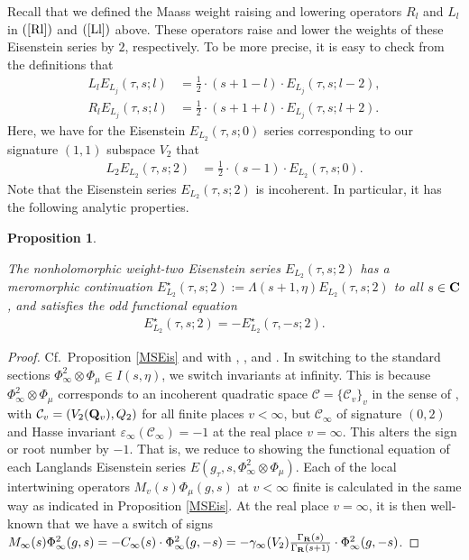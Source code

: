 \documentclass{amsart}
\newtheorem{proposition}[theorem]{Proposition}
\theoremstyle{definition}
\begin{document}
Recall that we defined the Maass weight raising and lowering operators $R_l$ and $L_l$ in $(\ref{Rl})$ and $(\ref{Ll})$ above.
These operators raise and lower the weights of these Eisenstein series by $2$, respectively. 
To be more precise, it is easy to check from the definitions that 
\begin{align*} L_l E_{L_j}(\tau, s; l) &= \frac{1}{2} \cdot (s+ 1 - l) \cdot E_{L_j}(\tau, s; l-2), \\
R_l E_{L_j}(\tau, s; l) &= \frac{1}{2} \cdot (s + 1 + l) \cdot E_{L_j}(\tau, s; l+2). \end{align*} 
Here, we have for the Eisenstein $E_{L_2}(\tau, s; 0)$ series corresponding to our signature $(1,1)$ subspace $V_2$ that 
\begin{equation}\begin{aligned}\label{2.20} 
L_2 E_{L_2}(\tau, s; 2) &= \frac{1}{2} \cdot (s-1) \cdot E_{L_2}(\tau, s; 0). \end{aligned}\end{equation}
Note that the Eisenstein series $E_{L_2}(\tau, s; 2)$ is incoherent. In particular, it has the following analytic properties. 

\begin{proposition}\label{incoherent} 

The nonholomorphic weight-two Eisenstein series $E_{L_2}(\tau, s; 2)$ has a meromorphic continuation 
$E^{\star}_{L_2}(\tau, s; 2) := \Lambda(s+1, \eta) E_{L_2}(\tau, s; 2)$ to all $s \in {\bf{C}}$,
and satisfies the odd functional equation \begin{align*} E_{L_2}^{\star}(\tau, s; 2) = - E_{L_2}^{\star}(\tau, -s; 2).\end{align*} \end{proposition}

\begin{proof} Cf.~Proposition \ref{MSEis} and \cite[Proposition 2.5]{BY} with \cite[$\S$2]{KuEis}, \cite[$\S 5.2$]{KY}, and \cite[$\S$2]{KRY}.
In switching to the standard sections $\Phi_{\infty}^2 \otimes \Phi_{\mu} \in I(s, \eta)$, we switch invariants at infinity. 
This is because $\Phi_{\infty}^2 \otimes \Phi_{\mu}$ corresponds to an incoherent quadratic space 
$\mathcal{C} = \lbrace \mathcal{C}_v \rbrace_v$ in the sense of \cite[Definition 2.1]{KuEis}, 
with $\mathcal{C}_v = (V_2({\bf{Q}}_v), Q_2)$ for all finite places $v<\infty$, but $\mathcal{C}_{\infty}$ of signature $(0, 2)$ and 
Hasse invariant $\varepsilon_{\infty}(\mathcal{C}_{\infty}) = -1$ at the real place $v= \infty$. This alters the sign or root number by $-1$. 
That is, we reduce to showing the functional equation of each Langlands Eisenstein series $E(g_{\tau}, s, \Phi_{\infty}^2 \otimes \Phi_{\mu})$.
Each of the local intertwining operators $M_v(s) \Phi_{\mu}(g, s)$ at $v<\infty$ finite is calculated in the same way as indicated in 
Proposition \ref{MSEis}. At the real place $v = \infty$, it is then well-known that we have a switch of signs 
$M_{\infty}(s) \Phi_{\infty}^{2}(g, s) = - C_{\infty}(s) \cdot \Phi_{\infty}^2(g, -s) 
= -\gamma_{\infty}(V_2) \frac{\Gamma_{\bf{R}}(s)}{\Gamma_{\bf{R}}(s+1)} \cdot \Phi_{\infty}^2(g, -s)$. \end{proof}
\end{document}
